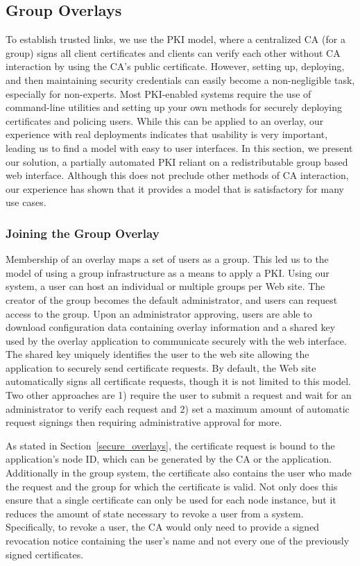 \documentclass[conference]{IEEEtran}
\begin{document}
\subsection{Group Overlays}
\label{group_overlays}
To establish trusted links, we use the PKI model, where a centralized CA (for a group) signs
all client certificates and clients can verify each other without CA interaction
by using the CA's public certificate.  However, setting up, deploying, and then
maintaining security credentials can easily become a non-negligible task,
especially for non-experts.  Most PKI-enabled systems require the use of
command-line utilities and setting up your own methods for securely
deploying certificates and policing users.  While this can be applied to an
overlay, our experience with real deployments indicates that usability is very
important, leading us to find a model with easy to user interfaces.
In this section, we present our solution, a partially automated PKI reliant on
a redistributable group based web interface.  Although this does not preclude
other methods of CA interaction, our experience has shown that it provides a
model that is satisfactory for many use cases.

\subsubsection{Joining the Group Overlay}
Membership of an overlay maps a set of users as a group. This led us to the
model of using a group infrastructure as a means to apply a PKI.  Using our
system, a user can host an individual or multiple groups per Web site.  The
creator of the group becomes the default administrator, and users can request
access to the group.  Upon an administrator approving, users are able to
download configuration data containing overlay information and a shared key
used by the overlay application to communicate securely with the web interface.
The shared key uniquely identifies the user to the web site allowing the
application to securely send certificate requests.  By default, the Web site
automatically signs all certificate requests, though it is not limited to this
model.  Two other approaches are 1) require the user to submit a request and
wait for an administrator to verify each request and 2) set a maximum amount
of automatic request signings then requiring administrative approval for more.

As stated in Section~\ref{secure_overlays}, the certificate request is bound
to the application's node ID, which can be generated by the CA or the
application.  Additionally in the group system, the certificate also contains
the user who made the request and the group for which the certificate is valid.
Not only does this ensure that a single certificate can only be used for each
node instance, but it reduces the amount of state necessary to revoke a user
from a system.  Specifically, to revoke a user, the CA would only need to
provide a signed revocation notice containing the user's name and not every one
of the previously signed certificates.
\end{document}
